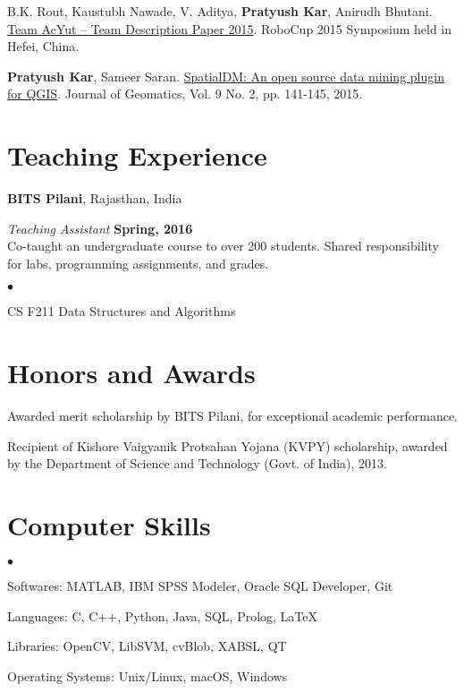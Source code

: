 \documentclass[margin,line]{res}
\newenvironment{list2}{
  \begin{list}{$\bullet$}{%
      \setlength{\itemsep}{0in}
      \setlength{\parsep}{0in} \setlength{\parskip}{0in}
      \setlength{\topsep}{0in} \setlength{\partopsep}{0in} 
      \setlength{\leftmargin}{0.2in}}}{\end{list}}
\begin{document}
\begin{resume}
B.K. Rout, Kaustubh Nawade, V. Aditya, {\bf Pratyush Kar}, Anirudh Bhutani. \href{https://p-kar.github.io/files/TDP15.pdf}{Team AcYut -- Team Description Paper 2015}. RoboCup 2015 Symposium held in Hefei, China.

{\bf Pratyush Kar}, Sameer Saran. \href{https://p-kar.github.io/files/JOG15.pdf}{SpatialDM: An open source data mining plugin for QGIS}. Journal of Geomatics, Vol. 9 No. 2, pp. 141-145, 2015.

\section{\sc Teaching Experience}
{\bf BITS Pilani}, Rajasthan, India

\vspace{-.3cm}
{\em Teaching Assistant} \hfill {\bf Spring, 2016}\\
Co-taught an undergraduate course to over 200 students.  Shared responsibility for labs, programming assignments, and grades.
\vspace*{.05in}  
\begin{list2}
\item CS F211 Data Structures and Algorithms
\end{list2}


\section{\sc Honors and Awards}

Awarded merit scholarship by BITS Pilani, for exceptional academic performance.

\vspace*{-2.5mm}
Recipient of Kishore Vaigyanik Protsahan Yojana (KVPY) scholarship, awarded by the Department of Science and Technology (Govt. of India), 2013.


\section{\sc Computer Skills} 
\begin{list2}
\item Softwares: MATLAB, IBM SPSS Modeler, Oracle SQL Developer, Git
\item Languages:  C, C++, Python, Java, SQL, Prolog, \LaTeX
\item Libraries: OpenCV, LibSVM, cvBlob, XABSL, QT
\item Operating Systems:  Unix/Linux, macOS, Windows
\end{list2}



\end{resume}
\end{document}
